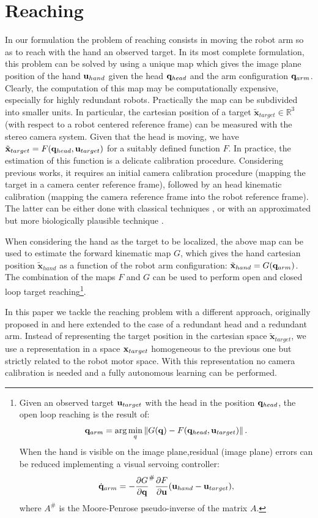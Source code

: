 \section{Reaching}
\label{sec:reaching}

In our formulation the problem of reaching consists in 
moving the robot arm so as to reach with the hand an observed 
target. In its most complete formulation, this problem can
be solved by using a unique map which gives the image plane position 
of the hand $\mathbf{u}_{hand}$ given the head $\mathbf{q}_{head}$ and the arm 
configuration $\mathbf q_{arm}$. Clearly, the computation of this map may be computationally
expensive, especially for highly redundant robots. Practically  
the map can be subdivided into smaller units. In particular, the cartesian 
position of a target $\tilde {\mathbf x}_{target} 
\in \mathbb R^3$ (with respect to a robot centered reference frame)
 can be measured with the stereo camera system. Given that the head is moving,
 we have $\tilde {\mathbf x}_{target}  = F(\mathbf{q}_{head}, \mathbf{u}_{target})$ for a
 suitably defined function $F$. In practice, the estimation of this function 
 is a delicate calibration procedure. Considering previous works, 
 it requires an initial camera calibration procedure (mapping the target
 in a camera center reference frame), followed by an head kinematic calibration 
 (mapping the camera reference frame into the robot reference frame). The latter
 can be either done with classical techniques \cite{Hollerbach96calibration},
 or with an approximated but more biologically plausible technique \cite{scaz07fast}. 

When considering the hand as the target to be localized, the above map can be used to
estimate the forward kinematic map $G$, which gives the hand cartesian position 
$\tilde {\mathbf x}_{hand}$ as a function of the robot arm configuration:
$\tilde {\mathbf x}_{hand}  = G(\mathbf q_{arm})$. The combination of the maps $F$ and $G$ can be used to 
perform open and closed loop target reaching\footnote{Given an observed target $\mathbf{u}_{target}$
with the head in the position $\mathbf{q}_{head}$, the open loop reaching is the result of:
$$ \mathbf q_{arm} =  \arg \min_q  \left\| G(\mathbf q) - F(\mathbf{q}_{head}, \mathbf{u}_{target}) \right\|. $$
When the hand is visible on the image plane,residual (image plane) errors can be 
reduced implementing a visual servoing controller:
$$ \dot {\mathbf q}_{arm} = - {\frac{\partial G} {\partial \mathbf q}}^\# {\frac{\partial F}{\partial \mathbf u}} (\mathbf{u}_{hand} - \mathbf{u}_{target}),
$$ where $A^\#$ is the Moore-Penrose pseudo-inverse of the matrix $A$.
}.

In this paper we tackle the reaching problem with a different approach, originally 
proposed in \cite{blackburn94learning} and here extended to the case of a redundant head
and a redundant arm. Instead of representing the target position in the cartesian space 
$\tilde {\mathbf x}_{target}$, we use a representation in a 
space $\mathbf{x}_{target}$ homogeneous to the previous one but strictly related to the robot
motor space. With this representation no camera calibration is needed and a fully 
autonomous learning can be performed. 

